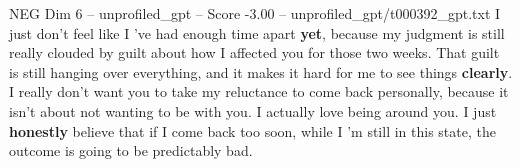 \begin{textsample}{NEG Dim 6 – unprofiled\_gpt – Score -3.00 – unprofiled\_gpt/t000392\_gpt.txt}  \label{ex:f6_neg_029}
I just don't feel like I ’ve had enough time apart \textbf{yet}, because my judgment is still really clouded by guilt about how I affected you for those two weeks.
That guilt is still hanging over everything, and it makes it hard for me to see things \textbf{clearly}.
I really don't want you to take my reluctance to come back personally, because it isn't about not wanting to be with you.
I actually love being around you.
I just \textbf{honestly} believe that if I come back too soon, while I ’m still in this state, the outcome is going to be predictably bad.

\end{textsample}
